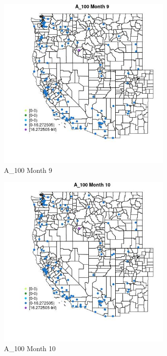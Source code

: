 \begin{figure} 
\centering  
\includegraphics[width=0.77\textwidth]{Code_Outputs/Report_ML_input_PM25_Step4_part_e_de_duplicated_aves_MapObsMo9A_100.jpg} 
\caption{\label{fig:Report_ML_input_PM25_Step4_part_e_de_duplicated_avesMapObsMo9A_100}A_100 Month 9} 
\end{figure} 
 

\begin{figure} 
\centering  
\includegraphics[width=0.77\textwidth]{Code_Outputs/Report_ML_input_PM25_Step4_part_e_de_duplicated_aves_MapObsMo10A_100.jpg} 
\caption{\label{fig:Report_ML_input_PM25_Step4_part_e_de_duplicated_avesMapObsMo10A_100}A_100 Month 10} 
\end{figure} 
 

